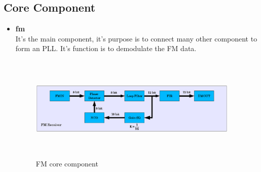 \documentclass[a4paper,10pt]{article}
\begin{document}
\subsection{Core Component}
   \begin{itemize}
   \item \textbf{fm}\\
   		It's the main component, it's purpose is to connect
                many other component to form an PLL. It's function is to 
		demodulate the FM data.

\begin{figure}[H]
\center
\includegraphics[width=10.0cm,height=5.0cm]{fm.eps}
\caption {FM core component}
\end{figure}

   \end{itemize}
\end{document}
